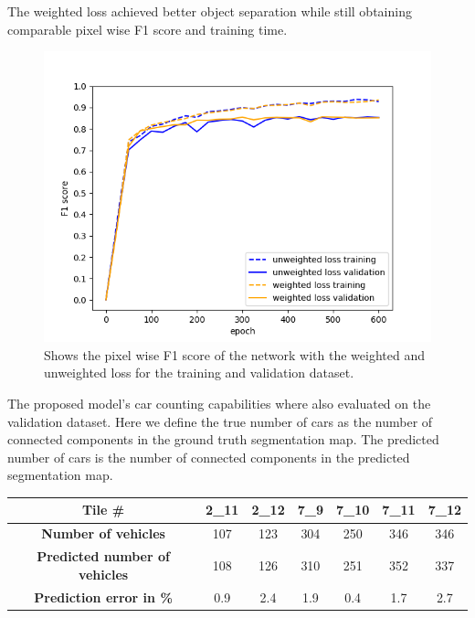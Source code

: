 \documentclass{kththesis}
\begin{document}
\noindent The weighted loss achieved better object separation while still obtaining comparable pixel wise F1 score and training time.
\begin{figure}[H]
\centering
      \includegraphics[scale=0.7]{weighted_vs_unweighted}
  \caption{Shows the pixel wise F1 score of the network with the weighted and unweighted loss for the training and validation dataset.} \label{fig:weighted_vs_unweighted}
\end{figure}
The proposed model's car counting capabilities where also evaluated on the validation dataset. Here we define the true number of cars as the number of connected components in the ground truth segmentation map. The predicted number of cars is the number of connected components in the predicted segmentation map.
\begin{center}
\begin{tabular}{|c c c c c c c|}
\hline
\textbf{Tile \#} & 2\_11  & 2\_12 & 7\_9 & 7\_10 & 7\_11 & 7\_12 \\
\hline
\textbf{Number of vehicles} & 107 & 123 & 304 & 250 & 346 & 346 \\
\textbf{Predicted number of vehicles} & 108 & 126 & 310 & 251 & 352 & 337 \\
\textbf{Prediction error in \%} &0.9 &  2.4 & 1.9 & 0.4 & 1.7 & 2.7\\
\hline
\end{tabular}
\end{center}
\end{document}
